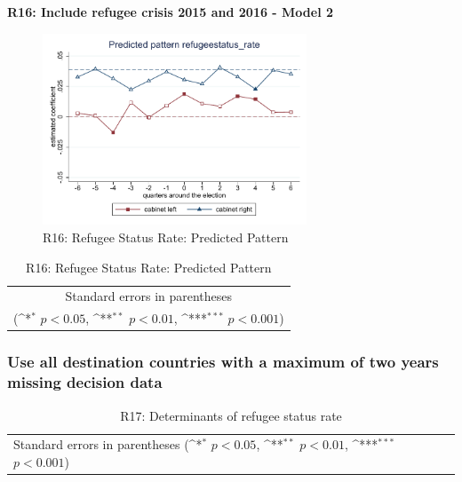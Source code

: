 \documentclass[10pt,a4paper]{scrartcl}
\begin{document}
\clearpage
\textbf{R16: Include refugee crisis 2015 and 2016 - Model 2}
\begin{figure}[!ht]
	\centering
	\includegraphics[width=0.7\textwidth]{figures_edited/refugeestatus_rate_graph2_R16.pdf}
	\caption{R16: Refugee Status Rate: Predicted Pattern}
\end{figure}

\begin{table}[!ht]\centering
	\footnotesize
	\renewcommand{\arraystretch}{1.2}
	\def\sym#1{\ifmmode^{#1}\else\(^{#1}\)\fi}
	\caption{R16: Refugee Status Rate: Predicted Pattern}
	\begin{tabular}{l*{2}{c}}
		\hline\hline
		
		\hline\hline
		\multicolumn{3}{c}{\footnotesize Standard errors in parentheses} \\
		\multicolumn{3}{c}{\footnotesize (\sym{*} \(p<0.05\), \sym{**} \(p<0.01\), \sym{***} \(p<0.001\))} \\
	\end{tabular}
\end{table}






\clearpage
\FloatBarrier
\subsubsection{Use all destination countries with a maximum of two years missing decision data}
\begin{table}[!ht]\centering
	\renewcommand{\arraystretch}{1.25}
	\small
	\def\sym#1{\ifmmode^{#1}\else\(^{#1}\)\fi}
	\caption{R17: Determinants of refugee status rate}
	\begin{tabular}{l*{3}{c}}
		\hline\hline
		
		\hline\hline
		\multicolumn{4}{l}{\footnotesize Standard errors in parentheses (\sym{*} \(p<0.05\), \sym{**} \(p<0.01\), \sym{***} \(p<0.001\))}\\
	\end{tabular}
\end{table}
\end{document}
